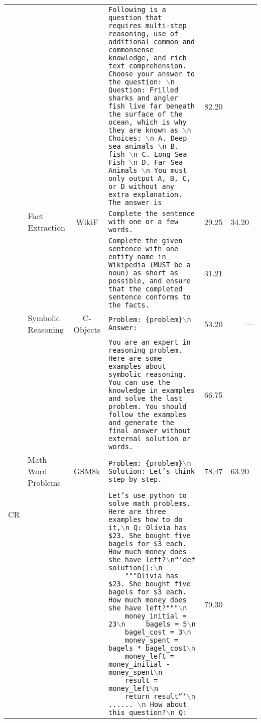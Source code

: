 \begin{table*}[!h]
\begin{tabular}{cp{}c p{} rr}
\cmidrule{4-5}
& & & \texttt{Following is a question that requires multi-step reasoning, use of additional common and commonsense knowledge, and rich text comprehension. Choose your answer to the question: $\backslash$n Question: Frilled sharks and angler fish live far beneath the surface of the ocean, which is why they are known as $\backslash$n Choices: $\backslash$n A. Deep sea animals $\backslash$n B. fish $\backslash$n C. Long Sea Fish $\backslash$n D. Far Sea Animals $\backslash$n You must only output A, B, C, or D without any extra explanation. The answer is} & 82.20 \\
\cmidrule{2-6}
& \multirow{2.5}{*}{Fact Extraction} & \multirow{2.5}{*}{WikiF} & \texttt{Complete the sentence with one or a few words.} & 29.25 & \multirow{2.5}{*}{34.20~\cite{Liang-arxiv-2022-Holistic}}  \\
\cmidrule{4-5}
& & & \texttt{Complete the given sentence with one entity name in Wikipedia (MUST be a noun) as short as possible, and ensure that the completed sentence conforms to the facts.} & 31.21\\
\midrule
\multirow{13}{*}{CR} & \multirow{2.5}{*}{Symbolic Reasoning} & \multirow{2.5}{*}{C-Objects} & \texttt{Problem: \{problem\}$\backslash$n
Answer:} & 53.20 & \multirow{2.5}{*}{---} \\
\cmidrule{4-5}
& & & \texttt{You are an expert in reasoning problem. Here are some examples about symbolic reasoning. You can use the knowledge in examples and solve the last problem. You should follow the examples and generate the final answer without external solution or words.} & 66.75\\
\cmidrule{2-6}
\cmidrule{2-6}
& \multirow{4.5}{*}{Math Word Problems} & \multirow{4.5}{*}{GSM8k} & \texttt{Problem: \{problem\}$\backslash$n
Solution: Let's think step by step.
} & 78.47 & \multirow{4.5}{*}{63.20~\cite{Zhu-arxiv-2022-Solving}} \\
\cmidrule{4-5}
& & & \texttt{Let's use python to solve math problems. Here are three examples how to do it,$\backslash$n Q: Olivia has \$23. She bought five bagels for \$3 each. How much money does she have left?$\backslash$n```def solution():$\backslash$n ~~~~"""Olivia has \$23. She bought five bagels for \$3 each. How much money does she have left?"""$\backslash$n ~~~~money\_initial = 23$\backslash$n ~~~~bagels = 5$\backslash$n ~~~~bagel\_cost = 3$\backslash$n ~~~~money\_spent = bagels * bagel\_cost$\backslash$n ~~~~money\_left = money\_initial - money\_spent$\backslash$n ~~~~result = money\_left$\backslash$n ~~~~return result```$\backslash$n ...... $\backslash$n How about this question?$\backslash$n Q:} & 79.30\\

\end{tabular}
\end{table*}
